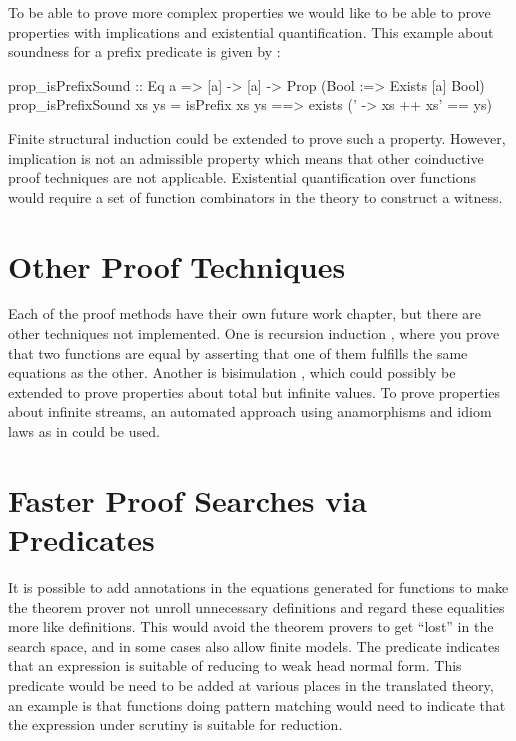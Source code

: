 To be able to prove more complex properties we would like to be able
to prove properties with implications and existential quantification.
This example about soundness for a prefix predicate is given by
\cite{smallcheck}:

\begin{code}
prop_isPrefixSound :: Eq a => [a] -> [a] -> Prop (Bool :=> Exists [a] Bool)
prop_isPrefixSound xs ys = isPrefix xs ys ==> exists (\xs' -> xs ++ xs' == ys)
\end{code}

Finite structural induction could be extended to prove such a
property. However, implication is not an admissible property which
means that other coinductive proof techniques are not
applicable. Existential quantification over functions would require a
set of function combinators in the theory to construct a witness.

\section{Other Proof Techniques}

Each of the proof methods have their own future work chapter, but
there are other techniques not implemented. One is recursion induction
\citep{recind}, where you prove that two functions are equal by
asserting that one of them fulfills the same equations as the
other. Another is bisimulation \citep{bisimulationCapretta}, which
could possibly be extended to prove properties about total but
infinite values. To prove properties about infinite streams, an
automated approach using anamorphisms and idiom laws as in
\cite{streams} could be used.

\section{Faster Proof Searches via Predicates}
\label{sec:minpredicate}

It is possible to add annotations in the equations generated for
functions to make the theorem prover not unroll unnecessary
definitions and regard these equalities more like definitions. This
would avoid the theorem provers to get ``lost'' in the search space,
and in some cases also allow finite models. The predicate indicates
that an expression is suitable of reducing to weak head normal
form. This predicate would be need to be added at various places in
the translated theory, an example is that functions doing pattern
matching would need to indicate that the expression under scrutiny is
suitable for reduction.
